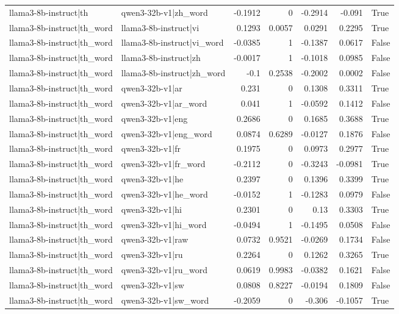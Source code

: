 \begin{table}
\begin{tabular}{l l r r r r l}
llama3-8b-instruct|th & qwen3-32b-v1|zh_word & -0.1912 & 0 & -0.2914 & -0.091 & True \\
llama3-8b-instruct|th_word & llama3-8b-instruct|vi & 0.1293 & 0.0057 & 0.0291 & 0.2295 & True \\
llama3-8b-instruct|th_word & llama3-8b-instruct|vi_word & -0.0385 & 1 & -0.1387 & 0.0617 & False \\
llama3-8b-instruct|th_word & llama3-8b-instruct|zh & -0.0017 & 1 & -0.1018 & 0.0985 & False \\
llama3-8b-instruct|th_word & llama3-8b-instruct|zh_word & -0.1 & 0.2538 & -0.2002 & 0.0002 & False \\
llama3-8b-instruct|th_word & qwen3-32b-v1|ar & 0.231 & 0 & 0.1308 & 0.3311 & True \\
llama3-8b-instruct|th_word & qwen3-32b-v1|ar_word & 0.041 & 1 & -0.0592 & 0.1412 & False \\
llama3-8b-instruct|th_word & qwen3-32b-v1|eng & 0.2686 & 0 & 0.1685 & 0.3688 & True \\
llama3-8b-instruct|th_word & qwen3-32b-v1|eng_word & 0.0874 & 0.6289 & -0.0127 & 0.1876 & False \\
llama3-8b-instruct|th_word & qwen3-32b-v1|fr & 0.1975 & 0 & 0.0973 & 0.2977 & True \\
llama3-8b-instruct|th_word & qwen3-32b-v1|fr_word & -0.2112 & 0 & -0.3243 & -0.0981 & True \\
llama3-8b-instruct|th_word & qwen3-32b-v1|he & 0.2397 & 0 & 0.1396 & 0.3399 & True \\
llama3-8b-instruct|th_word & qwen3-32b-v1|he_word & -0.0152 & 1 & -0.1283 & 0.0979 & False \\
llama3-8b-instruct|th_word & qwen3-32b-v1|hi & 0.2301 & 0 & 0.13 & 0.3303 & True \\
llama3-8b-instruct|th_word & qwen3-32b-v1|hi_word & -0.0494 & 1 & -0.1495 & 0.0508 & False \\
llama3-8b-instruct|th_word & qwen3-32b-v1|raw & 0.0732 & 0.9521 & -0.0269 & 0.1734 & False \\
llama3-8b-instruct|th_word & qwen3-32b-v1|ru & 0.2264 & 0 & 0.1262 & 0.3265 & True \\
llama3-8b-instruct|th_word & qwen3-32b-v1|ru_word & 0.0619 & 0.9983 & -0.0382 & 0.1621 & False \\
llama3-8b-instruct|th_word & qwen3-32b-v1|sw & 0.0808 & 0.8227 & -0.0194 & 0.1809 & False \\
llama3-8b-instruct|th_word & qwen3-32b-v1|sw_word & -0.2059 & 0 & -0.306 & -0.1057 & True \\

\end{tabular}
\end{table}
